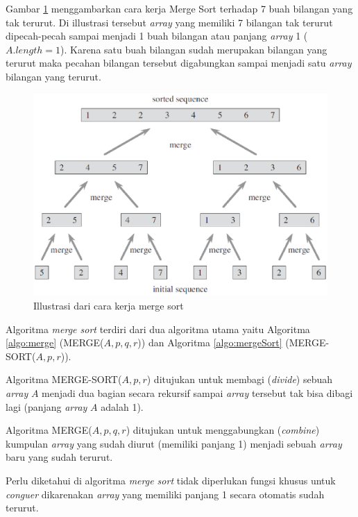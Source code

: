 Gambar \ref{fig:mergeSortIllustration} menggambarkan cara kerja Merge Sort terhadap 7 buah bilangan yang tak terurut. Di illustrasi tersebut \textit{array} yang memiliki 7 bilangan tak terurut dipecah-pecah sampai menjadi 1 buah bilangan atau panjang \textit{array} 1 ($A.length = 1$). Karena satu buah bilangan sudah merupakan bilangan yang terurut maka pecahan bilangan tersebut digabungkan sampai menjadi satu \textit{array} bilangan yang terurut. 

\begin{figure}[htbp]
	\includegraphics[scale=0.8]{fig/mergeSort1.eps}%
	\caption{Illustrasi dari cara kerja merge sort}%
	\label{fig:mergeSortIllustration}%
\end{figure}

Algoritma \textit{merge sort} terdiri dari dua algoritma utama yaitu Algoritma \ref{algo:merge} (MERGE($A,p,q,r$)) dan Algoritma \ref{algo:mergeSort} (MERGE-SORT($A,p,r$)). 

Algoritma MERGE-SORT($A,p,r$) ditujukan untuk membagi (\textit{divide}) sebuah \textit{array} $A$ menjadi dua bagian secara rekursif sampai \textit{array} tersebut tak bisa dibagi lagi (panjang \textit{array} $A$ adalah 1). 

Algoritma MERGE($A,p,q,r$) ditujukan untuk menggabungkan (\textit{combine}) kumpulan \textit{array} yang sudah diurut (memiliki panjang 1) menjadi sebuah \textit{array} baru yang sudah terurut.

Perlu diketahui di algoritma \textit{merge sort} tidak diperlukan fungsi khusus untuk \textit{conguer} dikarenakan \textit{array} yang memiliki panjang 1 secara otomatis sudah terurut.

